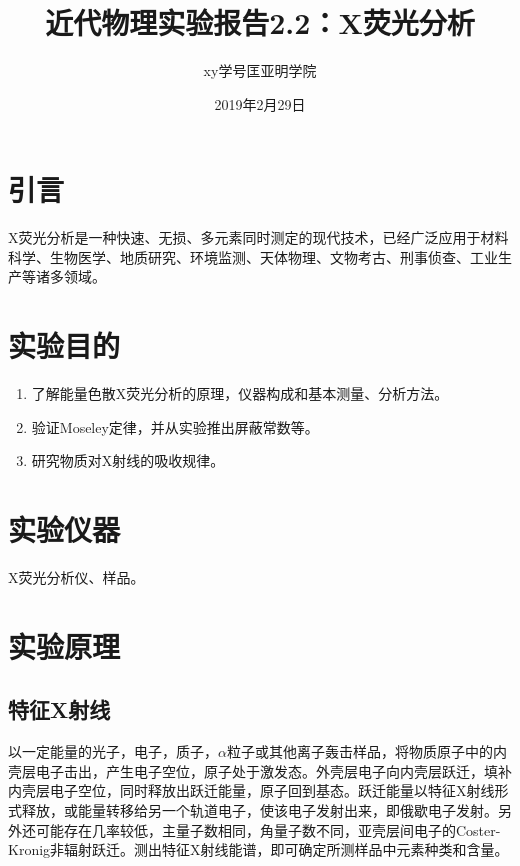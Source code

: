 \documentclass[a4paper]{article}
\title{近代物理实验报告2.2：X荧光分析}
\author{xy\quad 学号\quad 匡亚明学院}
\date{2019年2月29日}
\begin{document}
\maketitle


\section{引言}
X荧光分析是一种快速、无损、多元素同时测定的现代技术，已经广泛应用于材料科学、生物医学、地质研究、环境监测、天体物理、文物考古、刑事侦查、工业生产等诸多领域。

\section{实验目的}
\begin{enumerate}
\item 了解能量色散X荧光分析的原理，仪器构成和基本测量、分析方法。
\item 验证Moseley定律，并从实验推出屏蔽常数等。
\item 研究物质对X射线的吸收规律。
\end{enumerate}

\section{实验仪器}
X荧光分析仪、样品。

\section{实验原理}
\subsection{特征X射线}
以一定能量的光子，电子，质子，$\alpha$粒子或其他离子轰击样品，将物质原子中的内壳层电子击出，产生电子空位，原子处于激发态。外壳层电子向内壳层跃迁，填补内壳层电子空位，同时释放出跃迁能量，原子回到基态。跃迁能量以特征X射线形式释放，或能量转移给另一个轨道电子，使该电子发射出来，即俄歇电子发射。另外还可能存在几率较低，主量子数相同，角量子数不同，亚壳层间电子的Coster-Kronig非辐射跃迁。测出特征X射线能谱，即可确定所测样品中元素种类和含量。
\end{document}
